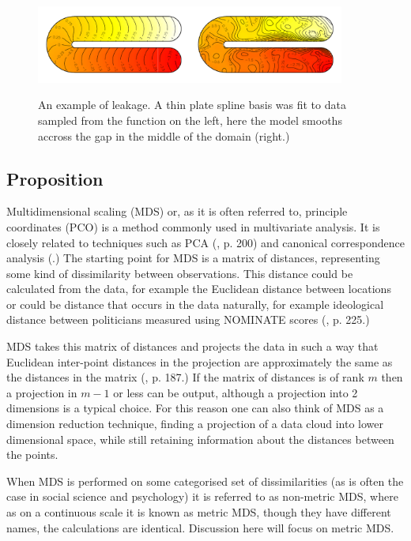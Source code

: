 \documentclass[a4paper,10pt]{article}
\begin{document}
\begin{figure}
\centering
\includegraphics[width=4in]{figs/ramsay-leak.pdf}\\
\caption{An example of leakage. A thin plate spline basis was fit to data sampled from the function on the left, here the model smooths accross the gap in the middle of the domain (right.)}
\label{leakage}
\end{figure}


\subsection{Proposition}

Multidimensional scaling (MDS) or, as it is often referred to, principle coordinates (PCO) is a method commonly used in multivariate analysis. It is closely related to techniques such as PCA (\cite{chatfieldcollins}, p. 200) and canonical correspondence analysis (\cite{terbraak}.) The starting point for MDS is a matrix of distances, representing some kind of dissimilarity between observations. This distance could be calculated from the data, for example the Euclidean distance between locations or could be distance that occurs in the data naturally, for example ideological distance between politicians measured using NOMINATE scores (\cite{quantss}, p. 225.) 

MDS takes this matrix of distances and projects the data in such a way that Euclidean inter-point distances in the projection are approximately the same as the distances in the matrix (\cite{chatfieldcollins}, p. 187.) If the matrix of distances is of rank $m$ then a projection in $m-1$ or less can be output, although a projection into 2 dimensions is a typical choice. For this reason one can also think of MDS as a dimension reduction technique, finding a projection of a data cloud into lower dimensional space, while still retaining information about the distances between the points.

When MDS is performed on some categorised set of dissimilarities (as is often the case in social science and psychology) it is referred to as non-metric MDS, where as on a continuous scale it is known as metric MDS, though they have different names, the calculations are identical. Discussion here will focus on metric MDS.
\end{document}
